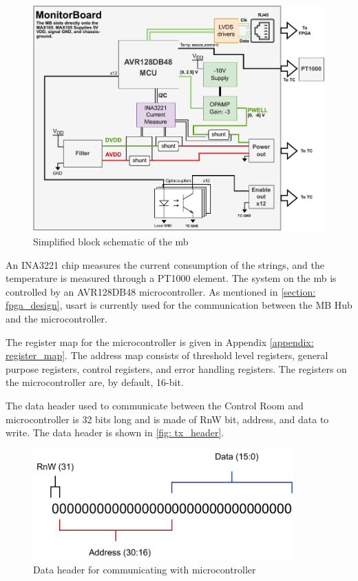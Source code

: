 \documentclass[main.tex]{subfiles}
\begin{document}
\begin{figure}[!ht]
    \centering
    \includegraphics[scale=0.7]{images/MonitorBoardBlockSchematic.pdf}
    \caption{Simplified block schematic of the \gls{mb}\cite{birger}}
    \label{fig: mb_schematic}
\end{figure}


 An INA3221 chip measures the current consumption of the strings, and the temperature is measured through a PT1000 element. The system on the \gls{mb} is controlled by an AVR128DB48 microcontroller. As mentioned in \autoref{section: fpga_design}, \acrshort{usart} is currently used for the communication between the MB Hub and the microcontroller.

The register map for the microcontroller is given in Appendix \ref{appendix: register_map}. The address map consists of threshold level registers, general purpose registers, control registers, and error handling registers. The registers on the microcontroller are, by default, 16-bit.

The data header used to communicate between the Control Room and microcontroller is 32 bits long and is made of RnW bit, address, and data to write. The data header is shown in \autoref{fig: tx_header}.

\begin{figure}[!htpb]
    \centering
    \includegraphics[width=10cm, scale=1]{images/TX packet header.pdf}
    \caption{Data header for communicating with microcontroller}
    \label{fig: tx_header}
\end{figure}
\FloatBarrier
\end{document}
